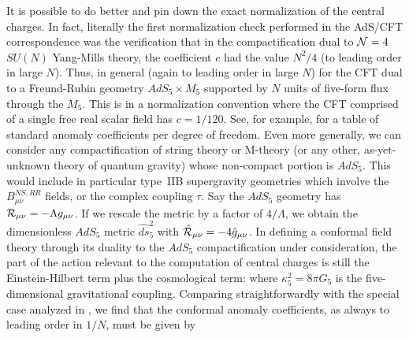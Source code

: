 It is possible to do better and pin down the exact normalization of the
central charges.  In fact, literally the first normalization check
performed in the AdS/CFT correspondence was the verification
\cite{Gubser:1998bc} that in the compactification dual to
${\cal N}=4$ $SU(N)$ Yang-Mills theory, the
coefficient $c$ had the value $N^2/4$ (to leading order in large $N$).
Thus, in general
 (again to leading order in large $N$) for the CFT dual to a Freund-Rubin
geometry $AdS_5 \times M_5$ supported by $N$ units of five-form flux
through the $M_5$.  This is in a normalization convention where the CFT
comprised of a single free real scalar field has $c = 1/120$.  See, 
for example,
\cite{Gubser:1999vd} for a table of standard anomaly coefficients per
degree of freedom.  Even more generally, we can consider any
compactification of string theory or M-theory (or any other, as-yet-unknown
theory of quantum gravity) whose non-compact portion is $AdS_5$.  This
would include in particular type~IIB supergravity geometries which involve
the $B_{\mu\nu}^{NS,RR}$ fields, or the complex coupling $\tau$.  Say the
$AdS_5$ geometry has ${\cal R}_{\mu\nu} = 
-\Lambda g_{\mu\nu}$.  If we rescale the
metric by a factor of $4/\Lambda$, we obtain the dimensionless $AdS_5$
metric $\widehat{ds}_5^2$ with $\hat{\cal R}_{\mu\nu} = -4 \hat{g}_{\mu\nu}$.
In defining a conformal field theory through its duality to the $AdS_5$
compactification under consideration, the part of the action relevant to
the computation of central charges is still the Einstein-Hilbert term plus
the cosmological term:
 where $\kappa_5^2 = 8\pi G_5$ is the five-dimensional gravitational
coupling.  Comparing straightforwardly with the special case analyzed in
\FreundRubinCharge, we find that the conformal anomaly coefficients, as
always to leading order in $1/N$, must be given by 



